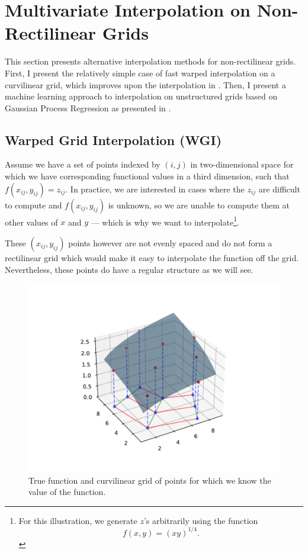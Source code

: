 \documentclass[\econtexRoot/SequentialEGM]{subfiles}
\begin{document}
\hypertarget{machine-learning}{}
\par\section{Multivariate Interpolation on Non-Rectilinear Grids}
\notinsubfile{\label{sec:gpr}}

This section presents alternative interpolation methods for non-rectilinear grids. First, I present the relatively simple case of fast warped interpolation on a curvilinear grid, which improves upon the interpolation in \cite{White2015-fg}. Then, I present a machine learning approach to interpolation on unstructured grids based on Gaussian Process Regression as presented in \cite{Scheidegger2019-xf}.

\subsection{Warped Grid Interpolation (WGI)}

Assume we have a set of points indexed by $(i,j)$ in two-dimensional space for which we have corresponding functional values in a third dimension, such that $f(x_{ij},y_{ij}) = z_{ij}$. In practice, we are interested in cases where the $z_{ij}$ are difficult to compute and $f(x_{ij},y_{ij})$ is unknown, so we are unable to compute them at other values of $x$ and $y$ --- which is why we want to interpolate\footnote{For this illustration, we generate $z$'s arbitrarily using the function $$f(x,y) = (xy)^{1/4}.$$}.

These $(x_{ij},y_{ij})$ points however are not evenly spaced and do not form a rectilinear grid which would make it easy to interpolate the function off the grid. Nevertheless, these points do have a regular structure as we will see.

\begin{figure}
	\centering
	\includegraphics[width=0.8\linewidth]{Figures/WarpedInterpolation.pdf}
	\caption{True function and curvilinear grid of points for which we know the value of the function.}
	\notinsubfile{\label{fig:warped_interp}}
\end{figure}
\end{document}
